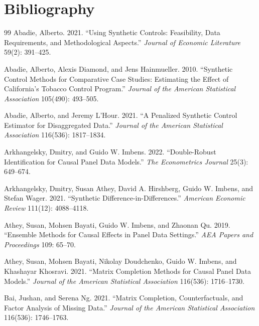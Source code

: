 \documentclass[11pt]{article}
\theoremstyle{definition}
\theoremstyle{plain}
\theoremstyle{remark}
\begin{document}
\section*{Bibliography}
\begin{thebibliography}{99}
Abadie, Alberto. 2021. ``Using Synthetic Controls: Feasibility, Data Requirements, and Methodological Aspects.'' \emph{Journal of Economic Literature} 59(2): 391--425.

Abadie, Alberto, Alexis Diamond, and Jens Hainmueller. 2010. ``Synthetic Control Methods for Comparative Case Studies: Estimating the Effect of California's Tobacco Control Program.'' \emph{Journal of the American Statistical Association} 105(490): 493--505.

Abadie, Alberto, and Jeremy L'Hour. 2021. ``A Penalized Synthetic Control Estimator for Disaggregated Data.'' \emph{Journal of the American Statistical Association} 116(536): 1817--1834.

Arkhangelsky, Dmitry, and Guido W. Imbens. 2022. ``Double-Robust Identification for Causal Panel Data Models.'' \emph{The Econometrics Journal} 25(3): 649--674.

Arkhangelsky, Dmitry, Susan Athey, David A. Hirshberg, Guido W. Imbens, and Stefan Wager. 2021. ``Synthetic Difference-in-Differences.'' \emph{American Economic Review} 111(12): 4088--4118.

Athey, Susan, Mohsen Bayati, Guido W. Imbens, and Zhaonan Qu. 2019. ``Ensemble Methods for Causal Effects in Panel Data Settings.'' \emph{AEA Papers and Proceedings} 109: 65--70.

Athey, Susan, Mohsen Bayati, Nikolay Doudchenko, Guido W. Imbens, and Khashayar Khosravi. 2021. ``Matrix Completion Methods for Causal Panel Data Models.'' \emph{Journal of the American Statistical Association} 116(536): 1716--1730.

Bai, Jushan, and Serena Ng. 2021. ``Matrix Completion, Counterfactuals, and Factor Analysis of Missing Data.'' \emph{Journal of the American Statistical Association} 116(536): 1746--1763.


\end{thebibliography}
\end{document}
